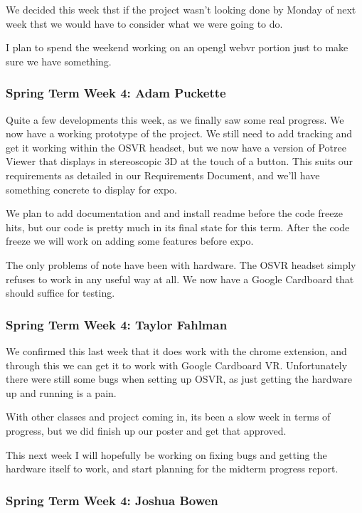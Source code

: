 \documentclass[draftclsnofoot,onecolumn]{IEEEtran}
\begin{document}
We decided this week thst if the project wasn't looking done by Monday of next week thst we would have to consider what we were going to do.

I plan to spend the weekend working on an opengl webvr portion just to make sure we have something.

\subsubsection{Spring Term Week 4: Adam Puckette}

Quite a few developments this week, as we finally saw some real progress. We now have a working prototype of the project. We still need to add tracking and get it working within the OSVR headset, but we now have a version of Potree Viewer that displays in stereoscopic 3D at the touch of a button. This suits our requirements as detailed in our Requirements Document, and we'll have something concrete to display for expo.

We plan to add documentation and and install readme before the code freeze hits, but our code is pretty much in its final state for this term. After the code freeze we will work on adding some features before expo.

The only problems of note have been with hardware. The OSVR headset simply refuses to work in any useful way at all. We now have a Google Cardboard that should suffice for testing.

\subsubsection{Spring Term Week 4: Taylor Fahlman}

We confirmed this last week that it does work with the chrome extension, and through this we can get it to work with Google Cardboard VR. Unfortunately there were still some bugs when setting up OSVR, as just getting the hardware up and running is a pain.

With other classes and project coming in, its been a slow week in terms of progress, but we did finish up our poster and get that approved.

This next week I will hopefully be working on fixing bugs and getting the hardware itself to work, and start planning for the midterm progress report.

\subsubsection{Spring Term Week 4: Joshua Bowen}
\end{document}
